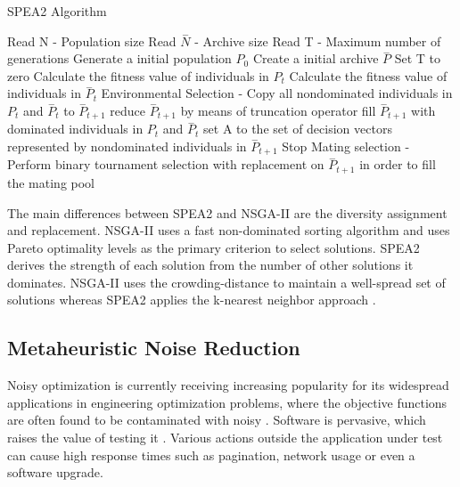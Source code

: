 \documentclass{report}
\begin{document}
\begin{algorithm}[h]
  \caption{SPEA2 Algorithm \cite{Zitzler2001}}\label{spea2}
  \begin{algorithmic}[1]

    \State Read N - Population size
    \State Read $ \overset{-}{N}$ - Archive size
    \State Read T - Maximum number of generations
    \State Generate a initial population $P_{0}$
    \State Create a initial archive $ \overset{-}{P} $
    \State Set T to zero
    \State Calculate the fitness value of individuals in $P_{t}$
    \State Calculate the fitness value of individuals in $\overset{-}{P}_{t}$
    \State Environmental Selection - Copy all nondominated individuals in $P_{t}$ and $\overset{-}{P}_{t}$  to $\overset{-}{P}_{t+1}$
    \State reduce  $\overset{-}{P}_{t+1}$ by means of truncation operator
    \State fill $\overset{-}{P}_{t+1}$ with dominated individuals in $P_{t}$ and $\overset{-}{P}_{t}$
    \EndIf
    \State set A to the set of decision vectors represented by nondominated individuals in $\overset{-}{P}_{t+1}$
    \State Stop
    \EndIf
    \State Mating selection - Perform binary tournament selection with replacement on $\overset{-}{P}_{t+1}$ in order to fill the mating pool
  \end{algorithmic}
\end{algorithm}

The main differences between SPEA2 and NSGA-II are the diversity assignment and replacement. NSGA-II uses a fast non-dominated sorting algorithm and uses Pareto optimality levels as the primary criterion to select solutions. SPEA2 derives the strength of each solution from the number of other solutions it dominates. NSGA-II uses the crowding-distance to maintain a well-spread set of solutions whereas SPEA2 applies the k-nearest neighbor approach \cite{Tervonen2017}.


\subsection{Metaheuristic Noise Reduction}

Noisy optimization is currently receiving increasing popularity for its widespread applications in engineering optimization
problems, where the objective functions are often found to be contaminated with noisy \cite{Rakshit2017}. Software is pervasive, which raises the value of testing it \cite{Sandler2004}. Various actions outside the application under test can cause high response times such as pagination, network usage or even a software upgrade.
\end{document}
